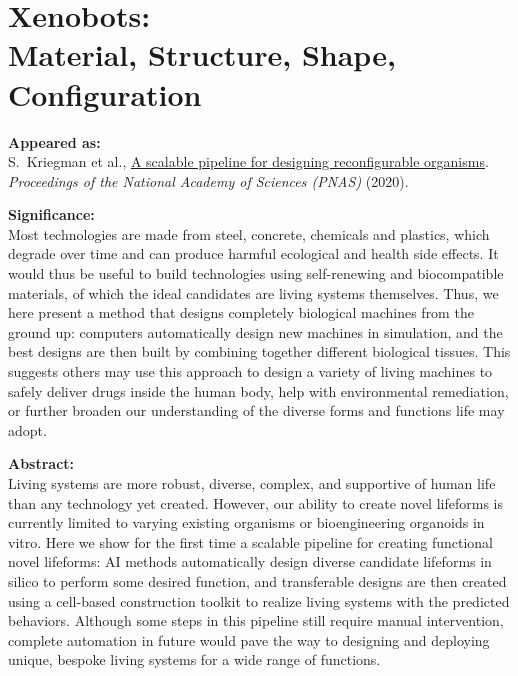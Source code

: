 

\chapter[Xenobots: Material, Structure, Shape, Configuration]{Xenobots: \\ {\LARGE Material, Structure, Shape, Configuration}}



\textbf{Appeared as:}\\
S.~Kriegman et al., \href{https://www.pnas.org/content/117/4/1853}{\color{blue}A scalable pipeline for designing reconfigurable organisms}. 
\textit{Proceedings of the National Academy of Sciences (PNAS)} (2020).

\vspace{1.5em}

\noindent
\textbf{Significance:}\\
\noindent
Most technologies are made from steel, concrete, chemicals and plastics, which degrade over time and can produce harmful ecological and health side effects. It would thus be useful to build technologies using self-renewing and biocompatible materials, of which the ideal candidates are living systems themselves. Thus, we here present a method that designs completely biological machines from the ground up: computers automatically design new machines in simulation, and the best designs are then built by combining together different biological tissues. This suggests others may use this approach to design a variety of living machines to safely deliver drugs inside the human body, help with environmental remediation, or further broaden our understanding of the diverse forms and functions life may adopt.

\vspace{1.5em}

\noindent
\textbf{Abstract:}\\
\noindent
Living systems are more robust, diverse, complex, and supportive of human life than any technology yet created. However, our ability to create novel lifeforms is currently limited to varying existing organisms or bioengineering organoids in vitro. Here we show for the first time a scalable pipeline for creating functional novel lifeforms: AI methods automatically design diverse candidate lifeforms in silico to perform some desired function, and transferable designs are then created using a cell-based construction toolkit to realize living systems with the predicted behaviors. Although some steps in this pipeline still require manual intervention, complete automation in future would pave the way to designing and deploying unique, bespoke living systems for a wide range of functions.



